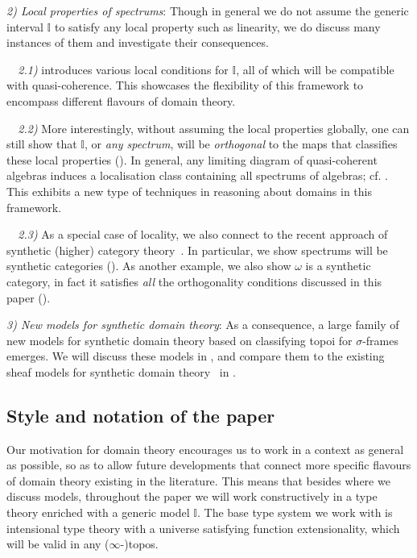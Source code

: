 \documentclass[12pt]{amsart}
\theoremstyle{definition}
\newcommand{\mbb}[1]{\mathbb{#1}}
\newcommand{\I}{\mbb I}
\begin{document}
\emph{2) Local properties of spectrums}: Though in general we do not assume the generic interval $\I$ to satisfy any local property such as linearity, we do discuss many instances of them and investigate their consequences.

\emph{\ \ 2.1)}  introduces various local conditions for $\I$, all of which will be compatible with quasi-coherence. This showcases the flexibility of this framework to encompass different flavours of domain theory.

\emph{\ \ 2.2)} More interestingly, without assuming the local properties globally, one can still show that $\I$, or \emph{any spectrum}, will be \emph{orthogonal} to the maps that classifies these local properties (). In general, any limiting diagram of quasi-coherent algebras induces a localisation class containing all spectrums of algebras; cf. . This exhibits a new type of techniques in reasoning about domains in this framework.

\emph{\ \ 2.3)} As a special case of locality, we also connect to the recent approach of synthetic (higher) category theory~\cite{riehl2017type,buchholtz2021synthetic,gratzer2024directed}. In particular, we show spectrums will be synthetic categories (). As another example, we also show $\omega$ is a synthetic category, in fact it satisfies \emph{all} the orthogonality conditions discussed in this paper (). 

\emph{3) New models for synthetic domain theory}: As a consequence, a large family of new models for synthetic domain theory based on classifying topoi for $\sigma$-frames emerges. We will discuss these models in , and compare them to the existing sheaf models for synthetic domain theory~\cite{FIORE1997151} in .

\subsection{Style and notation of the paper}

Our motivation for domain theory encourages us to work in a context as general as possible, so as to allow future developments that connect more specific flavours of domain theory existing in the literature. This means that besides  where we discuss models, throughout the paper we will work constructively in a type theory enriched with a generic model $\I$. The base type system we work with is intensional type theory with a universe satisfying function extensionality, which will be valid in any ($\infty$-)topos. 
\end{document}

